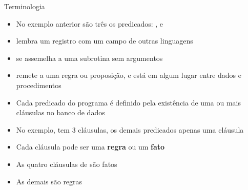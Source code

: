 \begin{frame}[fragile]{Terminologia}

    \begin{itemize}
        \item No exemplo anterior são três os predicados: ,
             e 

        \item {} lembra um registro com um campo de outras linguagens

        \item {} se assemelha a uma subrotina sem argumentos

        \item {} remete a uma regra ou proposição, e está em algum lugar 
            entre dados e procedimentos

        \item Cada predicado do programa é definido pela existência de uma ou mais cláusulas 
            no banco de dados

        \item No exemplo,  tem 3 cláusulas, os demais predicados apenas 
            uma cláusula

        \item Cada cláusula pode ser uma \textbf{regra} ou um \textbf{fato}

        \item As quatro cláusulas de  são fatos

        \item As demais são regras
    \end{itemize}

\end{frame}


